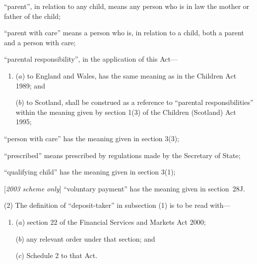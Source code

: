 \documentclass[12pt,a4paper]{article}
\begin{document}
\begin{enumerate}
    “parent”, in relation to any child, means any person who is in law the mother or father of the child;

“parent with care” means a person who is, in relation to a child, both a parent and a person with care;


“parental responsibility”, in the application of this Act—
\begin{enumerate}\item[]
($a$) to England and Wales, has the same meaning as in the Children Act 1989; and

($b$) to Scotland, shall be construed as a reference to “parental responsibilities” within the meaning given by section 1(3) of the Children (Scotland) Act 1995;
\end{enumerate}


    “person with care” has the meaning given in section 3(3);

    “prescribed” means prescribed by regulations made by the Secretary of State;

    “qualifying child” has the meaning given in section 3(1);

[\emph{2003 scheme only}] “voluntary payment” has the meaning given in section~28J.
\end{enumerate}

(2) The definition of “deposit-taker” in subsection (1) is to be read with—
\begin{enumerate}\item[]
($a$) section 22 of the Financial Services and Markets Act 2000;

($b$) any relevant order under that section; and

($c$) Schedule 2 to that Act.
\end{enumerate}
\end{document}

